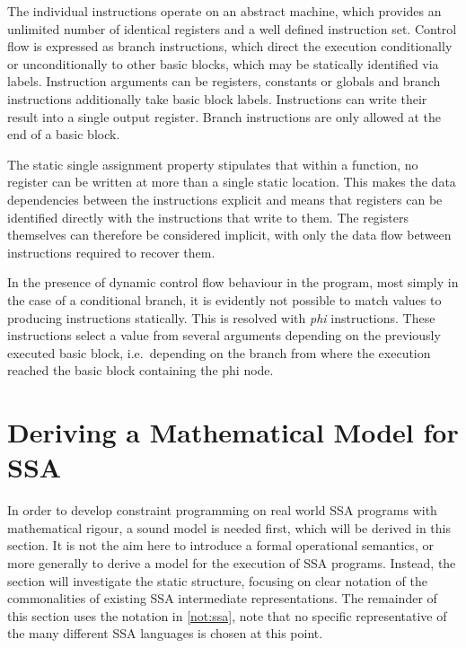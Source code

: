     The individual instructions operate on an abstract machine, which provides
    an unlimited number of identical registers and a well defined instruction
    set.
    Control flow is expressed as branch instructions, which direct the execution
    conditionally or unconditionally to other basic blocks, which may be
    statically identified via labels.
    Instruction arguments can be registers, constants or globals and branch
    instructions additionally take basic block labels.
    Instructions can write their result into a single output register.
    Branch instructions are only allowed at the end of a basic block.

    The static single assignment property stipulates that within a function,
    no register can be written at more than a single static location.
    This makes the data dependencies between the instructions explicit and
    means that registers can be identified directly with the instructions that
    write to them.
    The registers themselves can therefore be considered implicit, with only the
    data flow between instructions required to recover them.

    In the presence of dynamic control flow behaviour in the program, most
    simply in the case of a conditional branch, it is evidently not possible to
    match values to producing instructions statically.
    This is resolved with {\em phi} instructions.
    These instructions select a value from several arguments depending on the
    previously executed basic block, i.e.\ depending on the branch from where
    the execution reached the basic block containing the phi node.

\section{Deriving a Mathematical Model for SSA}

    In order to develop constraint programming on real world SSA programs with
    mathematical rigour, a sound model is needed first, which will be derived in
    this section.
    It is not the aim here to introduce a formal operational semantics, or more
    generally to derive a model for the execution of SSA programs.
    Instead, the section will investigate the static structure, focusing on
    clear notation of the commonalities of existing SSA intermediate
    representations.
    The remainder of this section uses the notation in \autoref{not:ssa}, note
    that no specific representative of the many different SSA languages is
    chosen at this point.

